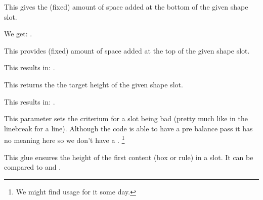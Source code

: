\stopnewprimitive

\startnewprimitive[title={\prm {balanceshapebottomspace}}]

This gives the (fixed) amount of space added at the bottom of the given shape
slot.

\startbuffer
\the{} \space
\the{}
\stopbuffer

\typebuffer

\start \getbuffer[shape] We get: {\inlinebuffer}. \stop

\stopnewprimitive

\startnewprimitive[title={\prm {balanceshapetopspace}}]

This provides (fixed) amount of space added at the top of the given shape slot.

\startbuffer
\the{} \space
\the{}
\stopbuffer

\typebuffer

\start \getbuffer[shape] This results in: {\inlinebuffer}. \stop

\stopnewprimitive

\startnewprimitive[title={\prm {balanceshapevsize}}]

This returns the the target height of the given shape slot.

\startbuffer
\the{} \space
\the{}
\stopbuffer

\typebuffer

\start \getbuffer[shape] This results in: {\inlinebuffer}. \stop

\stopnewprimitive

\startnewprimitive[title={\prm {balancetolerance}}]

This parameter sets the criterium for a slot being bad (pretty much like in the
linebreak for a line). Although the code is able to have a pre balance pass it
has no meaning here so we don't have a \type {\balancepretolerance}. \footnote
{We might find usage for it some day.}

\stopnewprimitive

\startnewprimitive[title={\prm {balancetopskip}}]

This glue ensures the height of the first content (box or rule) in a slot. It can
be compared to  and .

\stopnewprimitive

\startnewprimitive[title={\prm {balancevsize}}]

